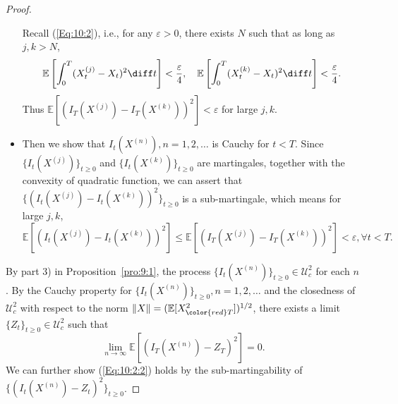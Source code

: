 \begin{proof}
\begin{itemize}
Recall (\eqref{Eq:10:2}), i.e., for any $\varepsilon>0$, there exists $N$ such that as long as $j,k>N$,
\[
\mathbb{E}\left[
\int_0^T(X^{(j)}_t-X_t)^2\diff t
\right]<\frac{\varepsilon}{4},\quad
\mathbb{E}\left[
\int_0^T(X^{(k)}_t-X_t)^2\diff t
\right]<\frac{\varepsilon}{4}.
\]
Thus $\mathbb{E}\left[
(I_T(X^{(j)}) - I_T(X^{(k)}))^2
\right]<\varepsilon$ for large $j,k$.
\item
Then we show that $I_t(X^{(n)}), n=1,2,\ldots$ is Cauchy for $t<T$.
Since $\{I_t(X^{(j)})\}_{t\ge0}$ and $\{I_t(X^{(k)})\}_{t\ge0}$ are martingales, together with the convexity of quadratic function, we can assert that $\{(I_t(X^{(j)}) - I_t(X^{(k)}))^2\}_{t\ge0}$ is a sub-martingale, which means for large $j,k$,
\[
\mathbb{E}\left[
(I_t(X^{(j)}) - I_t(X^{(k)}))^2
\right]\le \mathbb{E}\left[
(I_T(X^{(j)}) - I_T(X^{(k)}))^2
\right]<\varepsilon,\forall t<T.
\]
\end{itemize}
By part 3) in Proposition~\ref{pro:9:1}, the process $\{I_t(X^{(n)})\}_{t\ge0}\in\mathcal{U}_c^2$ for each $n$.
By the Cauchy property for $\{I_t(X^{(n)})\}_{t\ge0}, n=1,2,\ldots$ and the closedness of $\mathcal{U}_c^2$ with respect to the norm $\|X\|=(\mathbb{E}[X_{\color{red}T}^2])^{1/2}$, there exists a limit $\{Z_t\}_{t\ge0}\in\mathcal{U}_c^2$ such that
\[
\lim_{n\to\infty}\mathbb{E}\left[
(I_T(X^{(n)})-Z_T)^2
\right]=0.
\]
We can further show (\eqref{Eq:10:2:2}) holds by the sub-martingability of $\{(I_t(X^{(n)})-Z_t)^2\}_{t\ge0}$.


\end{proof}
